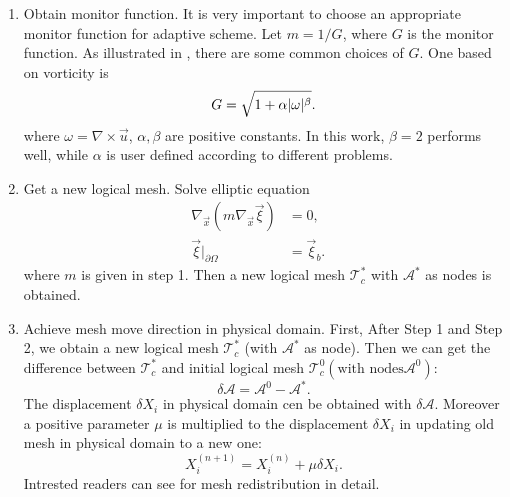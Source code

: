 \documentclass{eajam}
\begin{document}
     \begin{enumerate}[step 1]
     \item Obtain monitor function. It is very important to choose an
       appropriate monitor function for adaptive scheme. Let $m = 1/G$,
       where $G$ is the monitor function. As illustrated in
       \cite{di2005moving}, there are some common choices of $G$. One
       based on vorticity is 
       \begin{equation} 
         \centering
         G = \sqrt{1 + \alpha |\omega|^\beta}.
         \label{eq::monitor_vorticity}
       \end{equation}
       where $\omega = \nabla \times \vec{u}$, $\alpha, \beta$
       are positive constants. In this work, $\beta = 2$ performs 
       well, while $\alpha$ is user defined according to different
       problems. 

     \item Get a new logical mesh. Solve elliptic equation 
       \begin{equation}
         \begin{aligned}
           \nabla_{\vec{x}}(m \nabla_{\vec{x}} \vec{\xi})& = 0,& \\
           \vec{\xi}|_{\partial \Omega} &= \vec{\xi}_b.&
         \end{aligned}
         \label{eq::logical}
       \end{equation}
       where $m$ is given in step 1. Then a new logical mesh
       $\mathcal{T}_c^*$ with $\mathcal{A}^*$ as nodes is obtained.

     \item Achieve mesh move direction in physical domain.
       First, After Step 1 and Step 2, we obtain a new logical mesh
       $\mathcal{T}_c^*$ (with $\mathcal{A}^*$ as node). Then we can get
       the difference between $\mathcal{T}_c^*$ and initial logical mesh
       $\mathcal{T}_c^0(\mbox{with nodes} \mathcal{A}^0)$:
       \begin{equation}
         \delta \mathcal{A} = \mathcal{A}^0 - \mathcal{A}^*.
       \end{equation}
       The displacement $\delta X_i$ in physical domain cen be obtained
       with $\delta \mathcal{A}$. Moreover a positive parameter $\mu$ is multiplied to the 
       displacement $\delta X_i$ in updating old mesh in physical domain
       to a new one: 
       \begin{equation}
         X_i^{(n + 1)} = X_i^{(n)} + \mu \delta X_i.
       \end{equation}
       Intrested readers can see \cite{li2002moving} for mesh
       redistribution in detail.


\end{enumerate}
\end{document}
